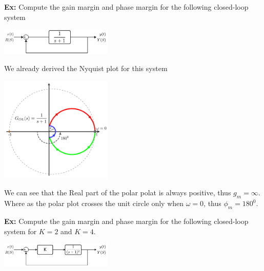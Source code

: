 \documentclass[twoside]{article}
\begin{document}
\vspace{12pt}

\textbf{Ex:} Compute the gain margin and phase margin 
for the following closed-loop system 

\begin{center}
\begin{minipage}[h]{\linewidth}
    \begin{center}
      \includegraphics[width=0.4\textwidth]{ex1block}
    \end{center}
\end{minipage}
\end{center}

We already derived the Nyquist plot for this system

\begin{center}
\begin{minipage}[h]{\linewidth}
    \begin{center}
      \includegraphics[width=0.4\textwidth]{ex1}
    \end{center}
\end{minipage}
\end{center}

We can see that the Real part of the polar polat is always 
positive, thus $g_m = \infty$. Where as the polar plot crosses
the unit circle only when $\omega = 0$, thus $\phi_m = 180^0$.

\newpage

\textbf{Ex:} Compute the gain margin and phase margin 
for the following closed-loop system for $K = 2$ and $K = 4$. 

\begin{center}
\begin{minipage}[h]{\linewidth}
    \begin{center}
      \includegraphics[width=0.4\textwidth]{ex2block}
    \end{center}
\end{minipage}
\end{center}
\end{document}

